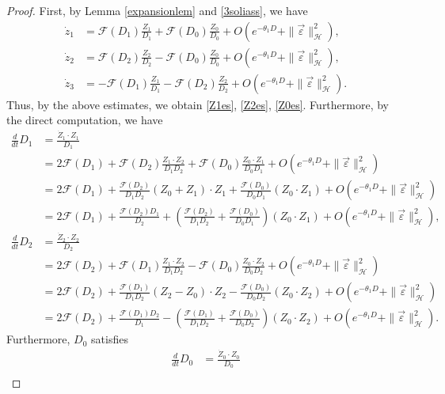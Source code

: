 \documentclass[reqno]{amsart}
\theoremstyle{plain}
\theoremstyle{definition}
\numberwithin{equation}{section}
\newcommand{\1}{\mathbbm{1}}
\begin{document}
\begin{proof}
First, by Lemma \ref{expansionlem} and \eqref{3soliass}, we have
\begin{align*}
\dot{z}_1&=\mathcal{F}(D_1)\frac{Z_1}{D_1}+\mathcal{F}(D_0)\frac{Z_0}{D_0}+O(e^{-\theta_1 D}+\|\vec{\varepsilon}\|_{\mathcal{H}}^2),
\\
\dot{z}_2&=\mathcal{F}(D_2)\frac{Z_2}{D_2}-\mathcal{F}(D_0)\frac{Z_0}{D_0}+O(e^{-\theta_1 D}+\|\vec{\varepsilon}\|_{\mathcal{H}}^2),
\\
\dot{z}_3&=-\mathcal{F}(D_1)\frac{Z_1}{D_1}-\mathcal{F}(D_2)\frac{Z_2}{D_2}+O(e^{-\theta_1 D}+\|\vec{\varepsilon}\|_{\mathcal{H}}^2).
\end{align*}
Thus, by the above estimates, we obtain \eqref{Z1es}, \eqref{Z2es}, \eqref{Z0es}. Furthermore, by the direct computation, we have
\begin{align*}
\frac{d}{dt}D_1&=\frac{\dot{Z}_1\cdot Z_1}{D_1}
\\
&=2\mathcal{F}(D_1)+\mathcal{F}(D_2)\frac{Z_1\cdot Z_2}{D_1D_2}+\mathcal{F}(D_0)\frac{Z_0\cdot Z_1}{D_0D_1}+O(e^{-\theta_1 D}+\|\vec{\varepsilon}\|_{\mathcal{H}}^2)
\\
&=2\mathcal{F}(D_1)+\frac{\mathcal{F}(D_2)}{D_1D_2}(Z_0+Z_1)\cdot Z_1+\frac{\mathcal{F}(D_0)}{D_0D_1}(Z_0\cdot Z_1)+O(e^{-\theta_1 D}+\|\vec{\varepsilon}\|_{\mathcal{H}}^2)
\\
&=2\mathcal{F}(D_1)+\frac{\mathcal{F}(D_2)D_1}{D_2}+\left(\frac{\mathcal{F}(D_2)}{D_1D_2}+\frac{\mathcal{F}(D_0)}{D_0D_1}\right)(Z_0\cdot Z_1)+O(e^{-\theta_1 D}+\|\vec{\varepsilon}\|_{\mathcal{H}}^2),
\\
\frac{d}{dt}D_2&=\frac{\dot{Z}_2\cdot Z_2}{D_2}
\\
&=2\mathcal{F}(D_2)+\mathcal{F}(D_1)\frac{Z_1\cdot Z_2}{D_1D_2}-\mathcal{F}(D_0)\frac{Z_0\cdot Z_2}{D_0D_2}+O(e^{-\theta_1 D}+\|\vec{\varepsilon}\|_{\mathcal{H}}^2)
\\
&=2\mathcal{F}(D_2)+\frac{\mathcal{F}(D_1)}{D_1D_2}(Z_2-Z_0)\cdot Z_2-\frac{\mathcal{F}(D_0)}{D_0D_2}(Z_0\cdot Z_2)+O(e^{-\theta_1 D}+\|\vec{\varepsilon}\|_{\mathcal{H}}^2)
\\
&=2\mathcal{F}(D_2)+\frac{\mathcal{F}(D_1)D_2}{D_1}-\left(\frac{\mathcal{F}(D_1)}{D_1D_2}+\frac{\mathcal{F}(D_0)}{D_0D_2}\right)(Z_0\cdot Z_2)+O(e^{-\theta_1 D}+\|\vec{\varepsilon}\|_{\mathcal{H}}^2).
\end{align*}
Furthermore, $D_0$ satisfies
\begin{align*}
\frac{d}{dt}D_0&=\frac{\dot{Z}_0\cdot Z_0}{D_0}
\\

\end{align*}
\end{proof}
\end{document}
